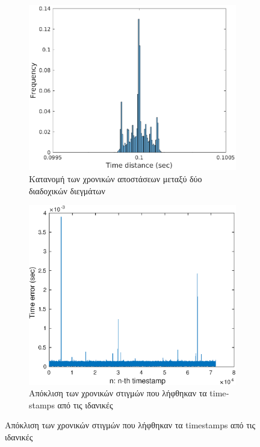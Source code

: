 \documentclass[a4paper,12pt]{article}
\begin{document}
\begin{figure}[!htbp]
	\hspace{-1cm}
	\begin{subfigure}[b]{0.6\textwidth}
		\includegraphics[width=\textwidth]{hist2.eps}
		\caption{Κατανομή των χρονικών αποστάσεων μεταξύ δύο διαδοχικών διεγμάτων}
		\label{fig:hist2}
	\end{subfigure}
	\begin{subfigure}[b]{0.5\textwidth}
		\includegraphics[width=\textwidth]{error2.eps}
		\caption{Απόκλιση των χρονικών στιγμών που λήφθηκαν τα \textlatin{timestamps} από τις ιδανικές}
		\label{fig:error2}
	\end{subfigure}
\end{figure}
\end{document}
